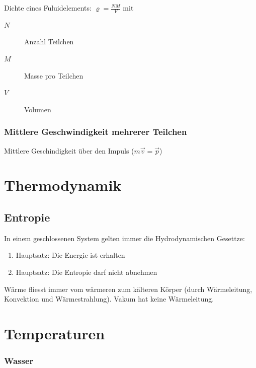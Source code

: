 \documentclass[a4paper]{scrartcl}
\begin{document}
Dichte eines Fuluidelements: $\varrho = \frac{NM}{V}$ mit
\begin{description}
	\item[$N$] Anzahl Teilchen
	\item[$M$] Masse pro Teilchen 
	\item[$V$] Volumen
\end{description}

\subsubsection{Mittlere Geschwindigkeit mehrerer Teilchen}
Mittlere Geschindigkeit über den Impuls ($m\vec{v} = \vec{p}$)
























\section{Thermodynamik}
\subsection{Entropie}

In einem geschlossenen System gelten immer die Hydrodynamischen Gesettze:

\begin{enumerate}
	\item Hauptsatz: Die Energie ist erhalten
	\item Hauptsatz: Die Entropie darf nicht abnehmen
\end{enumerate}

Wärme fliesst immer vom wärmeren zum kälteren Körper (durch Wärmeleitung, Konvektion und Wärmestrahlung). Vakum hat keine Wärmeleitung.


\section{Temperaturen}

\subsubsection{Wasser}
\end{document}
